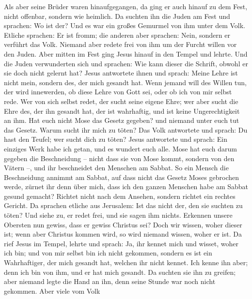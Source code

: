  Als aber seine Brüder waren hinaufgegangen, da ging er
auch hinauf zu dem Fest, nicht offenbar, sondern wie heimlich.
 Da suchten ihn die Juden am Fest und sprachen: Wo ist der?
 Und es war ein großes Gemurmel von ihm unter dem Volk.
Etliche sprachen: Er ist fromm; die anderen aber sprachen: Nein, sondern
er verführt das Volk.  Niemand aber redete frei von ihm um
der Furcht willen vor den Juden.  Aber mitten im Fest ging
Jesus hinauf in den Tempel und lehrte.  Und die Juden
verwunderten sich und sprachen: Wie kann dieser die Schrift, obwohl er
sie doch nicht gelernt hat?  Jesus antwortete ihnen und
sprach: Meine Lehre ist nicht mein, sondern des, der mich gesandt hat.
 Wenn jemand will des Willen tun, der wird innewerden, ob
diese Lehre von Gott sei, oder ob ich von mir selbst rede. 
Wer von sich selbst redet, der sucht seine eigene Ehre; wer aber sucht
die Ehre des, der ihn gesandt hat, der ist wahrhaftig, und ist keine
Ungerechtigkeit an ihm.  Hat euch nicht Mose das Gesetz
gegeben? und niemand unter euch tut das Gesetz. Warum sucht ihr mich zu
töten?  Das Volk antwortete und sprach: Du hast den Teufel;
wer sucht dich zu töten?  Jesus antwortete und sprach: Ein
einziges Werk habe ich getan, und es wundert euch alle. 
Mose hat euch darum gegeben die Beschneidung -- nicht dass sie von Mose
kommt, sondern von den Vätern --, und ihr beschneidet den Menschen am
Sabbat.  So ein Mensch die Beschneidung annimmt am Sabbat,
auf dass nicht das Gesetz Moses gebrochen werde, zürnet ihr denn über
mich, dass ich den ganzen Menschen habe am Sabbat gesund gemacht?
 Richtet nicht nach dem Ansehen, sondern richtet ein
rechtes Gericht.  Da sprachen etliche aus Jerusalem: Ist
das nicht der, den sie suchten zu töten?  Und siehe zu, er
redet frei, und sie sagen ihm nichts. Erkennen unsere Obersten nun
gewiss, dass er gewiss Christus sei?  Doch wir wissen,
woher dieser ist; wenn aber Christus kommen wird, so wird niemand
wissen, woher er ist.  Da rief Jesus im Tempel, lehrte und
sprach: Ja, ihr kennet mich und wisset, woher ich bin; und von mir
selbst bin ich nicht gekommen, sondern es ist ein Wahrhaftiger, der mich
gesandt hat, welchen ihr nicht kennet.  Ich kenne ihn aber;
denn ich bin von ihm, und er hat mich gesandt.  Da suchten
sie ihn zu greifen; aber niemand legte die Hand an ihn, denn seine
Stunde war noch nicht gekommen.  Aber viele vom Volk
